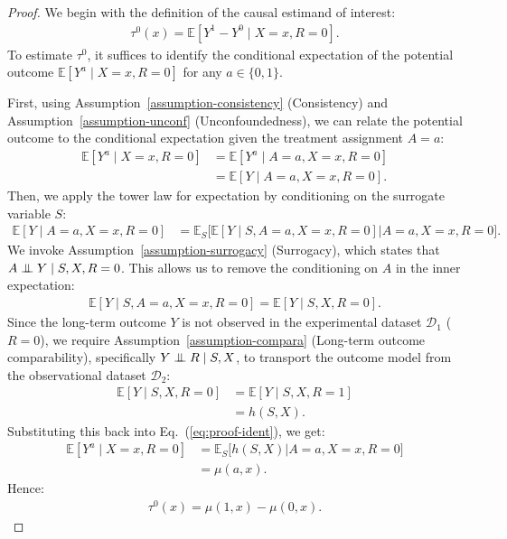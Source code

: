 \documentclass{article}
\theoremstyle{plain}
\theoremstyle{definition}
\theoremstyle{remark}
\newcommand{\indep}{\mathrel{\perp\mspace{-10mu}\perp}} %
\newcommand{\1}{\mathds{1}}                %
\begin{document}
\begin{proof}
    We begin with the definition of the causal estimand of interest:
    \begin{align}
        \tau^0(x) = \mathbb{E}[Y^1 - Y^0 \mid X=x, R=0].
    \end{align}
    To estimate $\tau^0$, it suffices to identify the conditional expectation of the potential outcome $\mathbb{E}[Y^a \mid X=x, R=0]$ for any $a \in \{0,1\}$.
    
    First, using Assumption~\ref{assumption-consistency} (Consistency) and Assumption~\ref{assumption-unconf} (Unconfoundedness), we can relate the potential outcome to the conditional expectation given the treatment assignment $A=a$:
    \begin{align}
        \mathbb{E}[Y^a \mid X=x, R=0] &= \mathbb{E}[Y^a \mid A=a, X=x, R=0] \nonumber \\
        &= \mathbb{E}[Y \mid A=a, X=x, R=0].
    \end{align}
    Then, we apply the tower law for expectation by conditioning on the surrogate variable $S$:
    \begin{align}
    \label{eq:proof-ident}
        \mathbb{E}[Y \mid A=a, X=x, R=0] &= \mathbb{E}_{S} \Big[ \mathbb{E}[Y \mid S, A=a, X=x, R=0] \Big| A=a, X=x, R=0 \Big].
    \end{align}
    We invoke Assumption~\ref{assumption-surrogacy} (Surrogacy), which states that $A \indep Y \mid S, X, R=0$. This allows us to remove the conditioning on $A$ in the inner expectation:
    \begin{align}
        \mathbb{E}[Y \mid S, A=a, X=x, R=0] = \mathbb{E}[Y \mid S, X, R=0].
    \end{align}
    Since the long-term outcome $Y$ is not observed in the experimental dataset $\mathcal{D}_1$ ($R=0$), we require Assumption~\ref{assumption-compara} (Long-term outcome comparability), specifically $Y \indep R \mid S, X$, to transport the outcome model from the observational dataset $\mathcal{D}_2$:
    \begin{align}
        \mathbb{E}[Y \mid S, X, R=0] &= \mathbb{E}[Y \mid S, X, R=1] \nonumber \\
        &= h(S,X).
    \end{align}
    Substituting this back into Eq.~(\ref{eq:proof-ident}), we get:
    \begin{align}
        \mathbb{E}[Y^a \mid X=x, R=0] &= \mathbb{E}_{S} \Big[ h(S,X) \Big| A=a, X=x, R=0 \Big] \nonumber \\
        &= \mu(a,x).
    \end{align}
   Hence:
    \begin{align}
        \tau^0(x) = \mu(1,x) - \mu(0,x).
    \end{align}
\end{proof}
\end{document}
